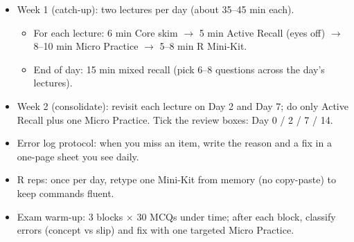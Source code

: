 \documentclass[11pt,a4paper]{article}
\def\textbf#1{#1}%
\begin{document}
\begin{tcolorbox}[colback=SoftBg,colframe=Accent!40!black,breakable,boxrule=0.5pt,arc=2mm]
\begin{itemize}
  \item \textbf{Week 1 (catch-up):} two lectures per day (about 35--45 min each).
  \begin{itemize}
    \item For each lecture: 6 min Core skim $\rightarrow$ 5 min Active Recall (eyes off) $\rightarrow$ 8--10 min Micro Practice $\rightarrow$ 5--8 min R Mini-Kit.
    \item End of day: 15 min mixed recall (pick 6--8 questions across the day's lectures).
  \end{itemize}
  \item \textbf{Week 2 (consolidate):} revisit each lecture on Day 2 and Day 7; do only Active Recall plus one Micro Practice. Tick the review boxes: Day 0 / 2 / 7 / 14.
  \item \textbf{Error log protocol:} when you miss an item, write the reason and a fix in a one-page sheet you see daily.
  \item \textbf{R reps:} once per day, retype one Mini-Kit from memory (no copy-paste) to keep commands fluent.
  \item \textbf{Exam warm-up:} 3 blocks $\times$ 30 MCQs under time; after each block, classify errors (concept vs slip) and fix with one targeted Micro Practice.
\end{itemize}
\end{tcolorbox}
\end{document}
